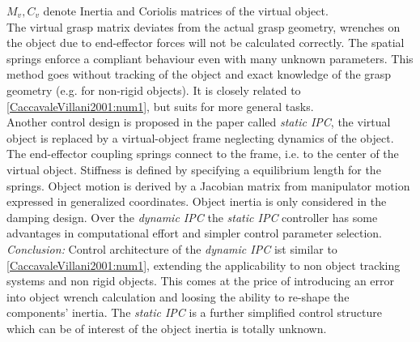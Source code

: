 \documentclass[conference]{IEEEtran}
\begin{document}
$ M_v,C_v $ denote Inertia and Coriolis matrices of the virtual object.\\
The virtual grasp matrix deviates from the actual grasp geometry, wrenches on the object due to end-effector forces will not be calculated correctly. The spatial springs enforce a compliant behaviour even with many unknown parameters. This method goes without tracking of the object and exact knowledge of the grasp geometry (e.g. for non-rigid objects). It is closely related to \ref{CaccavaleVillani2001:num1}, but suits for more general tasks.\\
Another control design is proposed in the paper called \textit{static IPC}, the virtual object is replaced by a virtual-object frame neglecting dynamics of the object. The end-effector coupling springs connect to the frame, i.e. to the center of the virtual object. Stiffness is defined by specifying a equilibrium length for the springs. Object motion is derived by a Jacobian matrix from manipulator motion expressed in generalized coordinates. Object inertia is only considered in the damping design. Over the \textit{dynamic IPC} the \textit{static IPC }controller has some advantages in computational effort and simpler control parameter selection.\\
\textit{Conclusion:} Control architecture of the \textit{dynamic IPC} ist similar to \ref{CaccavaleVillani2001:num1}, extending the applicability to non object tracking systems and non rigid objects. This comes at the price of introducing an error into object wrench calculation and loosing the ability to re-shape the components' inertia. The \textit{static IPC} is a further simplified control structure which can be of interest of the object inertia is totally unknown.

\end{document}
